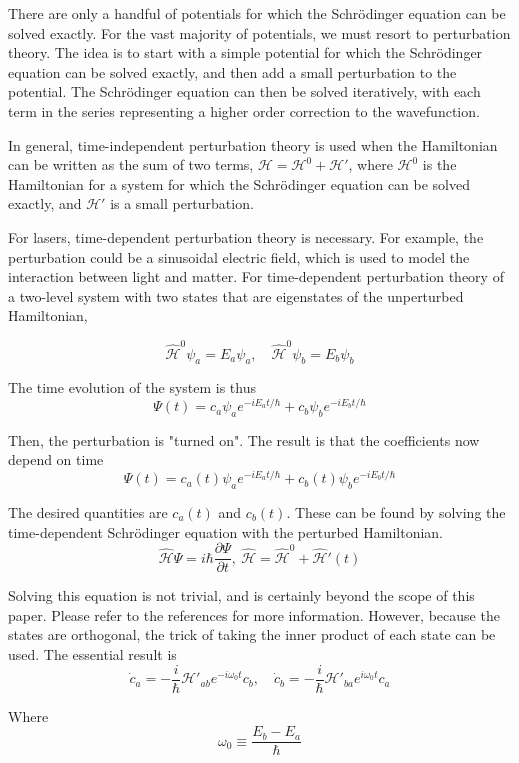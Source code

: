 \documentclass{article}
\newcommand{\p}{\partial}
\renewcommand{\H}{\mathcal{H}}
\begin{document}
There are only a handful of potentials for which the Schr\"odinger equation can be solved exactly. For the vast majority of potentials, we must resort to perturbation theory. The idea is to start with a simple potential for which the Schr\"odinger equation can be solved exactly, and then add a small perturbation to the potential. The Schr\"odinger equation can then be solved iteratively, with each term in the series representing a higher order correction to the wavefunction. 

In general, time-independent perturbation theory is used when the Hamiltonian can be written as the sum of two terms, $\H = \H^0 + \H'$, where $\H^0$ is the Hamiltonian for a system for which the Schr\"odinger equation can be solved exactly, and $\H'$ is a small perturbation.

For lasers, time-dependent perturbation theory is necessary. For example, the perturbation could be a sinusoidal electric field, which is used to model the interaction between light and matter. For time-dependent perturbation theory of a two-level system with two states that are eigenstates of the unperturbed Hamiltonian,

\[ \hat{\H}^0\psi_a = E_a\psi_a,\quad \hat{\H}^0\psi_b = E_b\psi_b \]

The time evolution of the system is thus 
\[ \Psi(t) = c_a\psi_ae^{-iE_at/\hbar} + c_b\psi_be^{-iE_bt/\hbar} \]

Then, the perturbation is "turned on". The result is that the coefficients now depend on time 
\[ \Psi(t) = c_a(t)\psi_ae^{-iE_at/\hbar} + c_b(t)\psi_be^{-iE_bt/\hbar} \]

The desired quantities are $c_a(t)$ and $c_b(t)$. These can be found by solving the time-dependent Schr\"odinger equation with the perturbed Hamiltonian. 
\[ \hat{\H}\Psi = i\hbar\frac{\p\Psi}{\p t},\ \hat{\H} = \hat{\H}^0 + \hat{\H}'(t) \]

Solving this equation is not trivial, and is certainly beyond the scope of this paper. Please refer to the references for more information. However, because the states are orthogonal, the trick of taking the inner product of each state can be used. The essential result is 
\begin{equation}
     \dot{c}_a = -\frac{i}{\hbar}\H'_{ab}e^{-i\omega_0t}c_b,\quad \dot{c}_b = -\frac{i}{\hbar}\H'_{ba}e^{i\omega_0t}c_a 
\end{equation}

Where 
\[ \omega_0 \equiv \frac{E_b - E_a}{\hbar} \]
\end{document}
